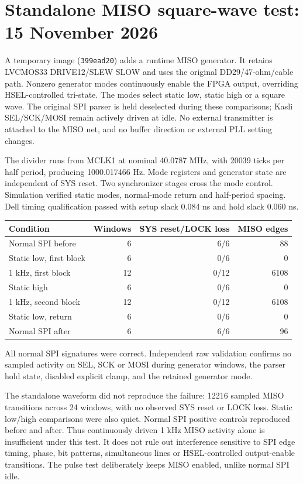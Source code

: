 \clearpage
\section{Standalone MISO square-wave test: 15 November 2026}
A temporary image (\texttt{399ead20}) adds a runtime MISO generator. It retains
LVCMOS33 DRIVE12/SLEW SLOW and uses the original DD29/47-ohm/cable path.
Nonzero generator modes continuously enable the FPGA output, overriding
HSEL-controlled tri-state. The modes select static low, static high or a square
wave. The original SPI parser is held deselected during these comparisons;
Kasli SEL/SCK/MOSI remain actively driven at idle. No external transmitter
is attached to the MISO net, and no buffer direction or external PLL setting changes.

The divider runs from MCLK1 at nominal 40.0787 MHz, with 20039 ticks per half
period, producing 1000.017466 Hz. Mode registers and generator state are
independent of SYS reset. Two synchronizer stages cross the mode control.
Simulation verified static modes, normal-mode return and half-period spacing.
Dell timing qualification passed with setup slack 0.084 ns and hold slack 0.060 ns.

\begin{center}\begin{tabular}{lrrr}\toprule
Condition & Windows & SYS reset/LOCK loss & MISO edges\\\midrule
Normal SPI before &6&6/6&88\\
Static low, first block &6&0/6&0\\
1 kHz, first block &12&0/12&6108\\
Static high &6&0/6&0\\
1 kHz, second block &12&0/12&6108\\
Static low, return &6&0/6&0\\
Normal SPI after &6&6/6&96\\\bottomrule
\end{tabular}\end{center}
All normal SPI signatures were correct. Independent raw validation confirms
no sampled activity on SEL, SCK or MOSI during generator windows, the parser
hold state, disabled explicit clamp, and the retained generator mode.

The standalone waveform did not reproduce the failure: 12216 sampled MISO
transitions across 24 windows, with no observed SYS reset or LOCK loss.
Static low/high comparisons were also quiet. Normal SPI positive controls
reproduced before and after. Thus continuously driven 1 kHz MISO activity
alone is insufficient under this test. It does not rule out interference
sensitive to SPI edge timing, phase, bit patterns, simultaneous lines or
HSEL-controlled output-enable transitions. The pulse test deliberately
keeps MISO enabled, unlike normal SPI idle.

